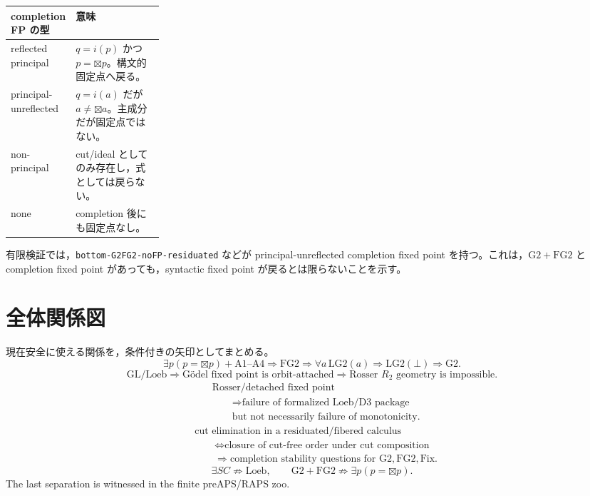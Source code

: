 ﻿\documentclass[a4paper,10pt]{ltjsarticle}
\newcommand{\Gtwo}{\mathrm{G2}}
\newcommand{\FGtwo}{\mathrm{FG2}}
\newcommand{\Btx}{\boxtimes}
\newcommand{\Fix}{\mathrm{Fix}}
\newcommand{\Bot}{\bot}
\begin{document}
\begin{center}
\begin{tabularx}{\linewidth}{>{\raggedright\arraybackslash}p{0.25\linewidth}
>{\raggedright\arraybackslash}X}
\toprule
completion FP の型 & 意味 \\
\midrule
reflected principal & \(q=i(p)\) かつ \(p=\Btx p\)。構文的固定点へ戻る。\\
principal-unreflected & \(q=i(a)\) だが \(a\ne\Btx a\)。主成分だが固定点ではない。\\
non-principal & cut/ideal としてのみ存在し，式としては戻らない。\\
none & completion 後にも固定点なし。\\
\bottomrule
\end{tabularx}
\end{center}

有限検証では，\texttt{bottom-G2FG2-noFP-residuated} などが
principal-unreflected completion fixed point を持つ。これは，\(\Gtwo+\FGtwo\) と
completion fixed point があっても，syntactic fixed point が戻るとは限らないことを示す。

\section{全体関係図}

現在安全に使える関係を，条件付きの矢印としてまとめる。
\[
\exists p(p=\Btx p)+\mathrm{A1\text{--}A4}
\Longrightarrow
\FGtwo
\Longrightarrow
\forall a\,\mathrm{LG2}(a)
\Longrightarrow
\mathrm{LG2}(\Bot)
\Longrightarrow
\Gtwo.
\]
\[
\mathrm{GL/Loeb}
\Longrightarrow
\text{Gödel fixed point is orbit-attached}
\Longrightarrow
\text{Rosser }R_2\text{ geometry is impossible}.
\]
\[
\begin{aligned}
&\text{Rosser/detached fixed point}\\
&\qquad\Longrightarrow
\text{failure of formalized Loeb/D3 package}\\
&\qquad\text{but not necessarily failure of monotonicity}.
\end{aligned}
\]
\[
\begin{aligned}
&\text{cut elimination in a residuated/fibered calculus}\\
&\qquad\Longleftrightarrow
\text{closure of cut-free order under cut composition}\\
&\qquad\Longrightarrow
\text{completion stability questions for }\Gtwo,\FGtwo,\Fix.
\end{aligned}
\]
\[
\exists SC\not\Rightarrow\mathrm{Loeb},
\qquad
\Gtwo+\FGtwo\not\Rightarrow\exists p(p=\Btx p).
\]
The last separation is witnessed in the finite preAPS/RAPS zoo.
\end{document}
